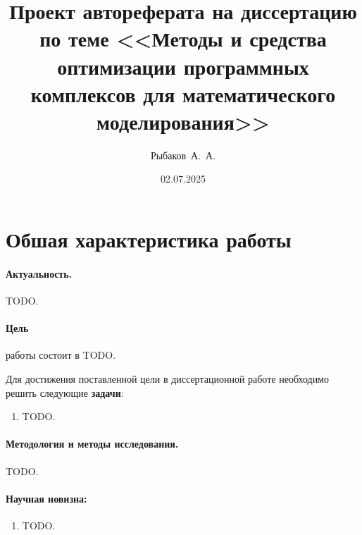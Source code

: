 \documentclass[a4paper,14pt]{extarticle}                     %
\theoremstyle{plain}                                         %
\begin{document}

\title{Проект автореферата на диссертацию по теме <<Методы и средства оптимизации программных комплексов для математического моделирования>>}
\author{Рыбаков~А.~А.}
\date{02.07.2025}
\maketitle
\thispagestyle{empty}                                        %


\newpage
\section*{Обшая характеристика работы}

\paragraph{Актуальность.} TODO.

\paragraph{Цель} работы состоит в TODO.

Для достижения поставленной цели в диссертационной работе необходимо решить следующие \textbf{задачи}:
\begin{enumerate}
\item TODO.
\end{enumerate}

\paragraph{Методология и методы исследования.} TODO.

\paragraph{Научная новизна:}
\begin{enumerate}
\item TODO.
\end{enumerate}
\end{document}
